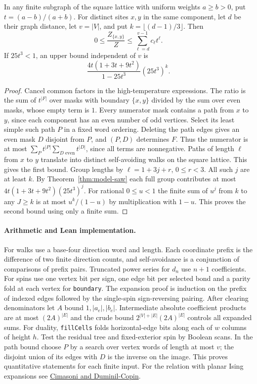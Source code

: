 \begin{proposition}\label{result77}
In any finite subgraph of the square lattice with uniform weights $a\ge b>0$, put $t=(a-b)/(a+b)$. For distinct sites $x,y$ in the same component, let $d$ be their graph distance, let $v=|V|$, and put $k=\lfloor(d-1)/3\rfloor$. Then
\[
 0\le\frac{Z_{\{x,y\}}}{Z}\le\sum_{\ell=d}^{v-1}c_\ell t^\ell .
\]
If $25t^3<1$, an upper bound independent of $v$ is
\[
 \frac{4t(1+3t+9t^2)}{1-25t^3}(25t^3)^k .
\]
\end{proposition}
\begin{proof}
Cancel common factors in the high-temperature expressions. The ratio is
the sum of $t^{|F|}$ over masks with boundary $\{x,y\}$ divided by the sum
over even masks, whose empty term is $1$. Every numerator mask contains
a path from $x$ to $y$, since each component has an even number of odd
vertices. Select its least simple such path $P$ in a fixed word ordering.
Deleting the path edges gives an even mask $D$ disjoint from $P$, and
$(P,D)$ determines $F$. Thus the numerator is at most
$\sum_P t^{|P|}\sum_{D\text{ even}}t^{|D|}$, since all terms are
nonnegative. Paths of length $\ell$ from $x$ to $y$ translate into
distinct self-avoiding walks on the square lattice. This gives the first
bound. Group lengths by $\ell=1+3j+r$, $0\le r<3$. All such $j$ are at
least $k$. By Theorem~\ref{thm:model-saw} each full group contributes at
most $4t(1+3t+9t^2)(25t^3)^j$. For rational $0\le u<1$ the finite
sum of $u^j$ from $k$ to any $J\ge k$ is at most $u^k/(1-u)$ by
multiplication with $1-u$. This proves the second bound using only a
finite sum.
\end{proof}

\paragraph{Arithmetic and Lean implementation.}
For walks use a base-four direction word and length. Each coordinate prefix
is the difference of two finite direction counts, and self-avoidance is
a conjunction of comparisons of prefix pairs. Truncated power series for
$d_n$ use $n+1$ coefficients. For spins use one vertex bit per sign,
one edge bit per selected bond and a parity fold at each vertex for
\texttt{boundary}. The expansion proof is induction on the prefix
of indexed edges followed by the single-spin sign-reversing pairing.
After clearing denominators let $A$ bound $1,|a_e|,|b_e|$. Intermediate
absolute coefficient products are at most $(2A)^{|E|}$ and the crude
bound $2^{|V|+|E|}(2A)^{|E|}$ controls all expanded sums. For duality,
\texttt{fillCells} folds horizontal-edge bits along each of $w$
columns of height $h$. Test the residual tree and fixed-exterior spin
by Boolean scans. In the path bound choose $P$ by a search over
vertex words of length at most $v$; the disjoint union of its edges
with $D$ is the inverse on the image. This proves quantitative
statements for each finite input. For the relation with planar Ising
expansions see \href{https://arxiv.org/abs/1209.0951}{Cimasoni and
Duminil-Copin}.

